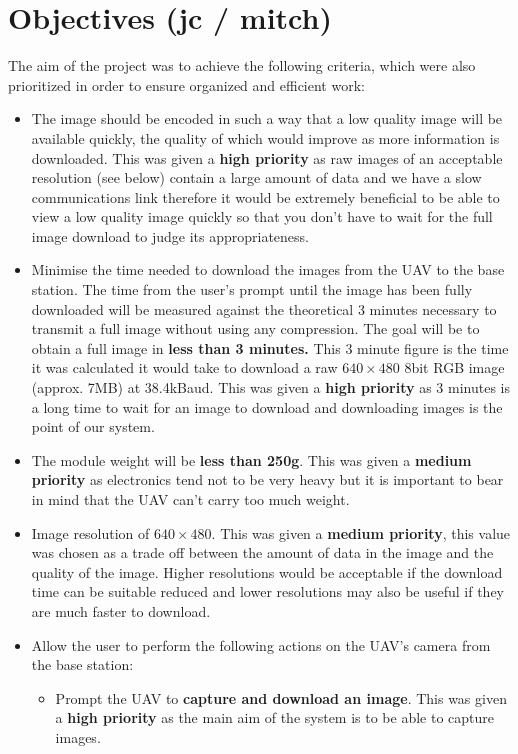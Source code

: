 \section{Objectives (jc / mitch)} 

The aim of the project was to achieve the following criteria, which were also prioritized in order to ensure organized and efficient work: 

\begin{itemize}
	\item The image should be encoded in such a way that a low quality image will be available quickly, the quality of which would improve as more information is downloaded. This was given a \textbf{high priority} as raw images of an acceptable resolution (see below) contain a large amount of data and we have a slow communications link therefore it would be extremely beneficial to be able to view a low quality image quickly so that you don't have to wait for the full image download to judge its appropriateness.
	\item Minimise the time needed to download the images from the UAV to the base station. The time from the user’s prompt until the image has been fully downloaded will be measured against the theoretical 3 minutes necessary to transmit a full image without using any compression. The goal will be to obtain a full image in \textbf{less than 3 minutes.} This 3 minute figure is the time it was calculated it would take to download a raw $640\times480$ 8bit RGB image (approx. 7MB) at 38.4kBaud. This was given a \textbf{high priority} as 3 minutes is a long time to wait for an image to download and downloading images is the point of our system.
	\item The module weight will be \textbf{less than 250g}. This was given a \textbf{medium priority} as electronics tend not to be very heavy but it is important to bear in mind that the UAV can't carry too much weight.
	\item Image resolution of \textbf{$640\times480$}. This was given a \textbf{medium priority}, this value was chosen as a trade off between the amount of data in the image and the quality of the image. Higher resolutions would be acceptable if the download time can be suitable reduced and lower resolutions may also be useful if they are much faster to download.
	\item Allow the user to perform the following actions on the UAV’s camera from the base station:
	\begin{itemize}
		\item Prompt the UAV to \textbf{capture and download an image}. This was given a \textbf{high priority} as the main aim of the system is to be able to capture images.

\end{itemize}
\end{itemize}
